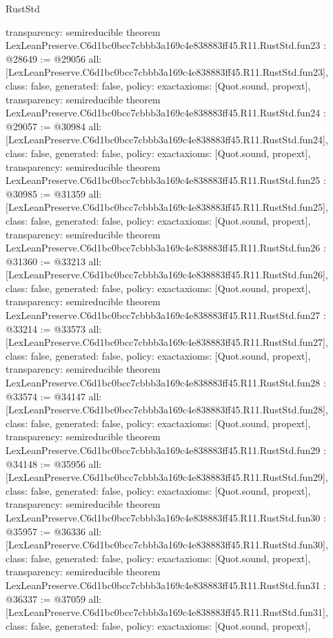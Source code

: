 \begin{lexlean}{RustStd}
\begin{coremodule}
{  transparency: semireducible
}
theorem LexLeanPreserve.C6d1bc0bcc7cbbb3a169c4e838883ff45.R11.RustStd.fun23 : @28649 := @29056 {
  all: [LexLeanPreserve.C6d1bc0bcc7cbbb3a169c4e838883ff45.R11.RustStd.fun23],
  class: false,
  generated: false,
  policy: exact{axioms: [Quot.sound, propext]},
  transparency: semireducible
}
theorem LexLeanPreserve.C6d1bc0bcc7cbbb3a169c4e838883ff45.R11.RustStd.fun24 : @29057 := @30984 {
  all: [LexLeanPreserve.C6d1bc0bcc7cbbb3a169c4e838883ff45.R11.RustStd.fun24],
  class: false,
  generated: false,
  policy: exact{axioms: [Quot.sound, propext]},
  transparency: semireducible
}
theorem LexLeanPreserve.C6d1bc0bcc7cbbb3a169c4e838883ff45.R11.RustStd.fun25 : @30985 := @31359 {
  all: [LexLeanPreserve.C6d1bc0bcc7cbbb3a169c4e838883ff45.R11.RustStd.fun25],
  class: false,
  generated: false,
  policy: exact{axioms: [Quot.sound, propext]},
  transparency: semireducible
}
theorem LexLeanPreserve.C6d1bc0bcc7cbbb3a169c4e838883ff45.R11.RustStd.fun26 : @31360 := @33213 {
  all: [LexLeanPreserve.C6d1bc0bcc7cbbb3a169c4e838883ff45.R11.RustStd.fun26],
  class: false,
  generated: false,
  policy: exact{axioms: [Quot.sound, propext]},
  transparency: semireducible
}
theorem LexLeanPreserve.C6d1bc0bcc7cbbb3a169c4e838883ff45.R11.RustStd.fun27 : @33214 := @33573 {
  all: [LexLeanPreserve.C6d1bc0bcc7cbbb3a169c4e838883ff45.R11.RustStd.fun27],
  class: false,
  generated: false,
  policy: exact{axioms: [Quot.sound, propext]},
  transparency: semireducible
}
theorem LexLeanPreserve.C6d1bc0bcc7cbbb3a169c4e838883ff45.R11.RustStd.fun28 : @33574 := @34147 {
  all: [LexLeanPreserve.C6d1bc0bcc7cbbb3a169c4e838883ff45.R11.RustStd.fun28],
  class: false,
  generated: false,
  policy: exact{axioms: [Quot.sound, propext]},
  transparency: semireducible
}
theorem LexLeanPreserve.C6d1bc0bcc7cbbb3a169c4e838883ff45.R11.RustStd.fun29 : @34148 := @35956 {
  all: [LexLeanPreserve.C6d1bc0bcc7cbbb3a169c4e838883ff45.R11.RustStd.fun29],
  class: false,
  generated: false,
  policy: exact{axioms: [Quot.sound, propext]},
  transparency: semireducible
}
theorem LexLeanPreserve.C6d1bc0bcc7cbbb3a169c4e838883ff45.R11.RustStd.fun30 : @35957 := @36336 {
  all: [LexLeanPreserve.C6d1bc0bcc7cbbb3a169c4e838883ff45.R11.RustStd.fun30],
  class: false,
  generated: false,
  policy: exact{axioms: [Quot.sound, propext]},
  transparency: semireducible
}
theorem LexLeanPreserve.C6d1bc0bcc7cbbb3a169c4e838883ff45.R11.RustStd.fun31 : @36337 := @37059 {
  all: [LexLeanPreserve.C6d1bc0bcc7cbbb3a169c4e838883ff45.R11.RustStd.fun31],
  class: false,
  generated: false,
  policy: exact{axioms: [Quot.sound, propext]},
}
\end{coremodule}
\end{lexlean}
